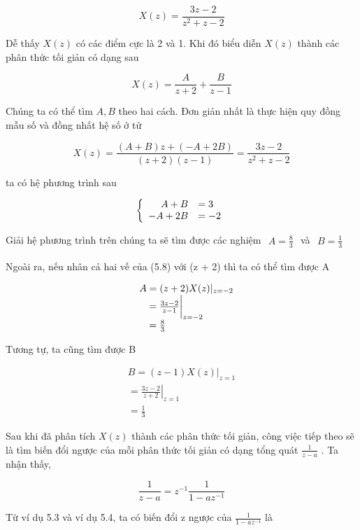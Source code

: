 \documentclass[
  10
]{article}
\begin{document}
\[
X (z) = \frac {3 z - 2}{z ^ {2} + z - 2}
\]

Dễ thấy \(X ( z )\) có các điểm cực là 2 và 1. Khi đó biểu diễn
\(X ( z )\) thành các phân thức tối giản có dạng sau

\[
X (z) = \frac {A}{z + 2} + \frac {B}{z - 1}\tag{5.8}
\]

Chúng ta có thể tìm \(A , B\) theo hai cách. Đơn giản nhất là thực hiện
quy đồng mẫu số và đồng nhất hệ số ở tử

\[
X (z) = \frac {(A + B) z + (- A + 2 B)}{(z + 2) (z - 1)} = \frac {3 z - 2}{z ^ {2} + z - 2}
\]

ta có hệ phương trình sau

\[
\left\{ \begin{array}{r l} A + B & = 3 \\ - A + 2 B & = - 2 \end{array} \right.
\]

Giải hệ phương trình trên chúng ta sẽ tìm được các nghiệm
\(\begin{array} { r } { A = \frac { 8 } { 3 } } \end{array}\) và
\(\begin{array} { r } { B = \frac { 1 } { 3 } } \end{array}\)

Ngoài ra, nếu nhân cả hai vế của (5.8) với (z + 2) thì ta có thể tìm
được A

\[
\begin{array}{r l} & A = (z + 2) X (z) | _ {z = - 2} \\ & \quad = \frac {3 z - 2}{z - 1} \bigg | _ {z = - 2} \\ & \quad = \frac {8}{3} \end{array}
\]

Tương tự, ta cũng tìm được B

\[
\begin{array}{c} B = (z - 1) X (z) | _ {z = 1} \\ = \left. \frac {3 z - 2}{z + 2} \right| _ {z = 1} \\ = \frac {1}{3} \end{array}
\]

Sau khi đã phân tích \(X ( z )\) thành các phân thức tối giản, công việc
tiếp theo sẽ là tìm biến đổi ngược của mỗi phân thức tối giản có dạng
tổng quát \(\scriptstyle { \frac { 1 } { z - a } }\) . Ta nhận thấy,

\[
\frac {1}{z - a} = z ^ {- 1} \frac {1}{1 - a z ^ {- 1}}
\]

Từ ví dụ 5.3 và ví dụ 5.4, ta có biến đổi z ngược của
\(\scriptstyle { \frac { 1 } { 1 - a z ^ { - 1 } } }\) là
\end{document}

